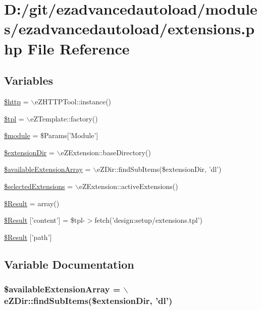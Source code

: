 \hypertarget{extensions_8php}{\section{\-D\-:/git/ezadvancedautoload/modules/ezadvancedautoload/extensions.php \-File \-Reference}
\label{extensions_8php}
}
\subsection*{\-Variables}
\begin{DoxyCompactItemize}
\item 
\hyperlink{extensions_8php_a775fc1707a7fa92aaa1c663c289dbbbc}{\$http} = $\backslash$e\-Z\-H\-T\-T\-P\-Tool\-::instance()
\item 
\hyperlink{extensions_8php_a04b1944cdb09f9a4e290cde7a12499e6}{\$tpl} = $\backslash$e\-Z\-Template\-::factory()
\item 
\hyperlink{extensions_8php_ac531301c55a8d8b6c7613597218ff482}{\$module} = \$\-Params\mbox{[}'\-Module'\mbox{]}
\item 
\hyperlink{extensions_8php_a511fe73f345235dca8dfab597f398521}{\$extension\-Dir} = $\backslash$e\-Z\-Extension\-::base\-Directory()
\item 
\hyperlink{extensions_8php_a6fef3e6ef57dbe6a39892b6de0cc7f5f}{\$available\-Extension\-Array} = $\backslash$e\-Z\-Dir\-::find\-Sub\-Items(\$extension\-Dir, 'dl')
\item 
\hyperlink{extensions_8php_adb784a735925c0ca3b600a1e0b1df50e}{\$selected\-Extensions} = $\backslash$e\-Z\-Extension\-::active\-Extensions()
\item 
\hyperlink{extensions_8php_a390d5702f3c15330fd764dbf08d5b2db}{\$\-Result} = array()
\item 
\hyperlink{extensions_8php_a0d32c70e3cf8c7b3fe5e4a499e9cd58f}{\$\-Result} \mbox{[}'content'\mbox{]} = \$tpl-\/$>$fetch('design\-:setup/extensions.\-tpl')
\item 
\hyperlink{extensions_8php_a94a2cc5784adee982dec0235638f6251}{\$\-Result} \mbox{[}'path'\mbox{]}
\end{DoxyCompactItemize}


\subsection{\-Variable \-Documentation}
\hypertarget{extensions_8php_a6fef3e6ef57dbe6a39892b6de0cc7f5f}{
\subsubsection[{\$available\-Extension\-Array}]{\setlength{\rightskip}{0pt plus 5cm}\$available\-Extension\-Array = $\backslash$e\-Z\-Dir\-::find\-Sub\-Items(\$extension\-Dir, 'dl')}}\label{extensions_8php_a6fef3e6ef57dbe6a39892b6de0cc7f5f}


